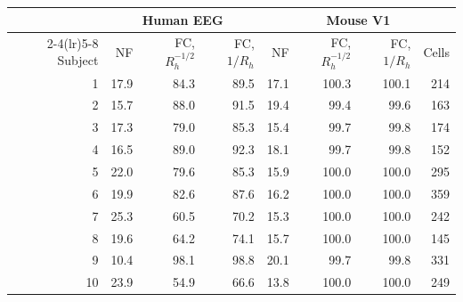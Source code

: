 \begin{tabular}{rrrrrrrr}
\toprule
 & \multicolumn{3}{c}{Human EEG} & \multicolumn{4}{c}{Mouse V1} \\
\cmidrule(lr){2-4}\cmidrule(lr){5-8}
Subject & NF & FC, $R_h^{-1/2}$ & FC, $1/R_h$ & NF & FC, $R_h^{-1/2}$ & FC, $1/R_h$ & Cells \\
\midrule
1 & 17.9 & 84.3 & 89.5 & 17.1 & 100.3 & 100.1 & 214 \\
2 & 15.7 & 88.0 & 91.5 & 19.4 & 99.4 & 99.6 & 163 \\
3 & 17.3 & 79.0 & 85.3 & 15.4 & 99.7 & 99.8 & 174 \\
4 & 16.5 & 89.0 & 92.3 & 18.1 & 99.7 & 99.8 & 152 \\
5 & 22.0 & 79.6 & 85.3 & 15.9 & 100.0 & 100.0 & 295 \\
6 & 19.9 & 82.6 & 87.6 & 16.2 & 100.0 & 100.0 & 359 \\
7 & 25.3 & 60.5 & 70.2 & 15.3 & 100.0 & 100.0 & 242 \\
8 & 19.6 & 64.2 & 74.1 & 15.7 & 100.0 & 100.0 & 145 \\
9 & 10.4 & 98.1 & 98.8 & 20.1 & 99.7 & 99.8 & 331 \\
10 & 23.9 & 54.9 & 66.6 & 13.8 & 100.0 & 100.0 & 249 \\
\bottomrule
\end{tabular}
